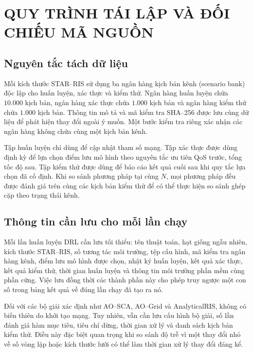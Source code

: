 \chapter{QUY TRÌNH TÁI LẬP VÀ ĐỐI CHIẾU MÃ NGUỒN}
\label{app:tai-lap}

\section{Nguyên tắc tách dữ liệu}
\label{sec:tach-du-lieu}

Mỗi kích thước STAR--RIS sử dụng ba ngân hàng kịch bản kênh (scenario bank) độc lập cho huấn luyện, xác
thực và kiểm thử. Ngân hàng huấn luyện chứa $10.000$ kịch bản, ngân hàng xác thực chứa
$1.000$ kịch bản và ngân hàng kiểm thử chứa $1.000$ kịch bản. Thông tin mô tả và mã kiểm
tra SHA--256 được lưu cùng dữ liệu để phát hiện thay đổi ngoài ý muốn. Một bước kiểm tra
riêng xác nhận các ngân hàng không chứa cùng một kịch bản kênh.

Tập huấn luyện chỉ dùng để cập nhật tham số mạng. Tập xác thực được dùng định kỳ để lựa
chọn điểm lưu mô hình theo nguyên tắc ưu tiên QoS trước, tổng tốc độ sau. Tập kiểm thử
được dùng để báo cáo kết quả cuối sau khi quy tắc lựa chọn đã cố định. Khi so sánh phương
pháp tại cùng $N$, mọi phương pháp đều được đánh giá trên cùng các kịch bản kiểm thử để có
thể thực hiện so sánh ghép cặp theo trạng thái kênh.

\section{Thông tin cần lưu cho mỗi lần chạy}
\label{sec:thong-tin-luu}

Mỗi lần huấn luyện DRL cần lưu tối thiểu: tên thuật toán, hạt giống ngẫu nhiên, kích thước
STAR--RIS, số tương tác môi trường, tệp cấu hình, mã kiểm tra ngân hàng kênh, điểm lưu mô
hình được chọn, nhật ký huấn luyện, kết quả xác thực, kết quả kiểm thử, thời gian huấn
luyện và thông tin môi trường phần mềm cùng phần cứng. Việc lưu đồng thời các thành phần
này cho phép truy ngược một con số trong bảng kết quả về đúng lần chạy đã tạo ra nó.

Đối với các bộ giải xác định như AO--SCA, AO--Grid và AnalyticalRIS, không có biến thiên do
khởi tạo mạng. Tuy nhiên, vẫn cần lưu cấu hình bộ giải, số lần đánh giá hàm mục tiêu, tiêu
chí dừng, thời gian xử lý và danh sách kịch bản kiểm thử. Điều này đặc biệt quan trọng khi
so sánh độ trễ vì một thay đổi nhỏ về số vòng lặp hoặc kích thước lưới có thể làm thời gian
xử lý thay đổi đáng kể.

